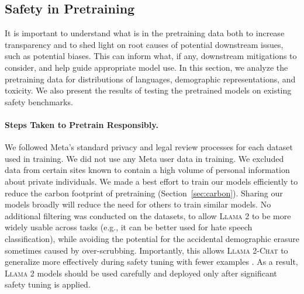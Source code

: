 \documentclass{article}
\newcommand{\modelname}{\textsc{Llama 2-Chat}\xspace}
\newcommand{\cinnamon}{\textsc{Llama 2}\xspace}
\begin{document}
\subsection{Safety in Pretraining}
\label{sec:safety_data}
It is important to understand what is in the pretraining data both to increase transparency and to shed light on root causes of potential downstream issues, such as potential biases. This can inform what, if any, downstream mitigations to consider, and help guide appropriate model use. In this section, we analyze the pretraining data for distributions of languages, demographic representations, and toxicity. We also present the results of testing the pretrained models on existing safety benchmarks.

\paragraph{Steps Taken to Pretrain Responsibly.} We followed Meta's standard privacy and legal review processes for each dataset used in training. We did not use any Meta user data in training. We excluded data from certain sites known to contain a high volume of personal information about private individuals. We made a best effort to train our models efficiently to reduce the carbon footprint of pretraining (Section~\ref{sec:carbon}). Sharing our models broadly will reduce the need for others to train similar models. No additional filtering was conducted on the datasets, to allow \cinnamon to be more widely usable across tasks (e.g., it can be better used for hate speech classification), while avoiding the potential for the accidental demographic erasure sometimes caused by over-scrubbing. Importantly, this allows \modelname to generalize more effectively during safety tuning with fewer examples \citep{welbl2021challenges, korbak2023pretraining, xu2021recipes}. As a result, \cinnamon models should be used carefully and deployed only after significant safety tuning is applied.
\end{document}
